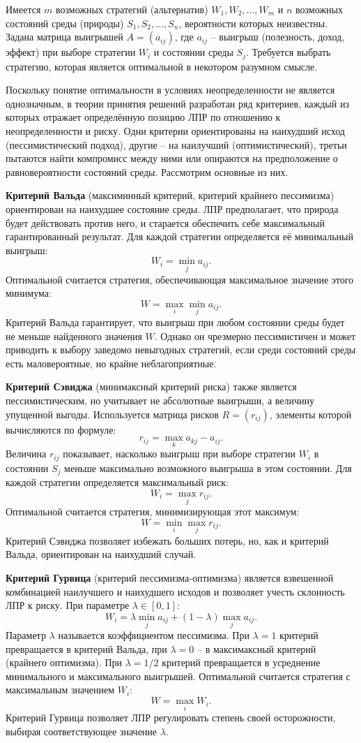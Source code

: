 Имеется $m$ возможных стратегий (альтернатив) $W_1, W_2, \ldots, W_m$ и $n$ возможных состояний среды (природы) $S_1, S_2, \ldots, S_n$, вероятности которых неизвестны. Задана матрица выигрышей $A = (a_{ij})$, где $a_{ij}$ -- выигрыш (полезность, доход, эффект) при выборе стратегии $W_i$ и состоянии среды $S_j$. Требуется выбрать стратегию, которая является оптимальной в некотором разумном смысле.

Поскольку понятие оптимальности в условиях неопределенности не является однозначным, в теории принятия решений разработан ряд критериев, каждый из которых отражает определённую позицию ЛПР по отношению к неопределенности и риску. Одни критерии ориентированы на наихудший исход (пессимистический подход), другие -- на наилучший (оптимистический), третьи пытаются найти компромисс между ними или опираются на предположение о равновероятности состояний среды. Рассмотрим основные из них.

\textbf{Критерий Вальда} (максиминный критерий, критерий крайнего пессимизма) ориентирован на наихудшее состояние среды. ЛПР предполагает, что природа будет действовать против него, и старается обеспечить себе максимальный гарантированный результат. Для каждой стратегии определяется её минимальный выигрыш:
\[
W_i = \min_{j} a_{ij}.
\]
Оптимальной считается стратегия, обеспечивающая максимальное значение этого минимума:
\[
W = \max_{i} \min_{j} a_{ij}.
\]
Критерий Вальда гарантирует, что выигрыш при любом состоянии среды будет не меньше найденного значения $W$. Однако он чрезмерно пессимистичен и может приводить к выбору заведомо невыгодных стратегий, если среди состояний среды есть маловероятные, но крайне неблагоприятные.

\textbf{Критерий Сэвиджа} (минимаксный критерий риска) также является пессимистическим, но учитывает не абсолютные выигрыши, а величину упущенной выгоды. Используется матрица рисков $R = (r_{ij})$, элементы которой вычисляются по формуле:
\[
r_{ij} = \max_{k} a_{kj} - a_{ij}.
\]
Величина $r_{ij}$ показывает, насколько выигрыш при выборе стратегии $W_i$ в состоянии $S_j$ меньше максимально возможного выигрыша в этом состоянии. Для каждой стратегии определяется максимальный риск:
\[
W_i = \max_{j} r_{ij}.
\]
Оптимальной считается стратегия, минимизирующая этот максимум:
\[
W = \min_{i} \max_{j} r_{ij}.
\]
Критерий Сэвиджа позволяет избежать больших потерь, но, как и критерий Вальда, ориентирован на наихудший случай.

\textbf{Критерий Гурвица} (критерий пессимизма-оптимизма) является взвешенной комбинацией наилучшего и наихудшего исходов и позволяет учесть склонность ЛПР к риску. При параметре $\lambda \in [0,1]$:
\[
W_i = \lambda \min_{j} a_{ij} + (1-\lambda) \max_{j} a_{ij}.
\]
Параметр $\lambda$ называется коэффициентом пессимизма. При $\lambda = 1$ критерий превращается в критерий Вальда, при $\lambda = 0$ -- в максимаксный критерий (крайнего оптимизма). При $\lambda = 1/2$ критерий превращается в усреднение минимального и максимального выигрышей. Оптимальной считается стратегия с максимальным значением $W_i$:
\[
W = \max_{i} W_i.
\]
Критерий Гурвица позволяет ЛПР регулировать степень своей осторожности, выбирая соответствующее значение $\lambda$.

